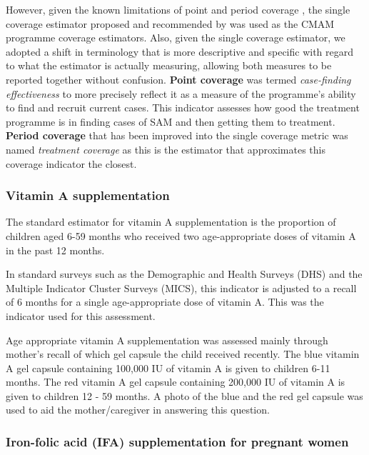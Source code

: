 \documentclass[12pt,a4paper]{article}
\begin{document}
However, given the known limitations of point and period coverage \citep{Myatt:2012tt}, the single coverage estimator proposed and recommended by \citet{Balegamire:2015ud} was used as the CMAM programme coverage estimators. Also, given the single coverage estimator, we adopted a shift in terminology that is more descriptive and specific with regard to what the estimator is actually measuring, allowing both measures to be reported together without confusion. \textbf{Point coverage} was termed \emph{case-finding effectiveness} to more precisely reflect it as a measure of the programme's ability to find and recruit current cases. This indicator assesses how good the treatment programme is in finding cases of SAM and then getting them to treatment. \textbf{Period coverage} that has been improved into the single coverage metric was named \emph{treatment coverage} as this is the estimator that approximates this coverage indicator the closest.

\hypertarget{vitamin-a-supplementation}{%
\subsubsection{Vitamin A supplementation}\label{vitamin-a-supplementation}}

The standard estimator for vitamin A supplementation is the proportion of children aged 6-59 months who received two age-appropriate doses of vitamin A in the past 12 months.

In standard surveys such as the Demographic and Health Surveys (DHS) and the Multiple Indicator Cluster Surveys (MICS), this indicator is adjusted to a recall of 6 months for a single age-appropriate dose of vitamin A. This was the indicator used for this assessment.

Age appropriate vitamin A supplementation was assessed mainly through mother's recall of which gel capsule the child received recently. The blue vitamin A gel capsule containing 100,000 IU of vitamin A is given to children 6-11 months. The red vitamin A gel capsule containing 200,000 IU of vitamin A is given to children 12 - 59 months. A photo of the blue and the red gel capsule was used to aid the mother/caregiver in answering this question.

\hypertarget{iron-folic-acid-ifa-supplementation-for-pregnant-women}{%
\subsubsection{Iron-folic acid (IFA) supplementation for pregnant women}\label{iron-folic-acid-ifa-supplementation-for-pregnant-women}}
\end{document}

